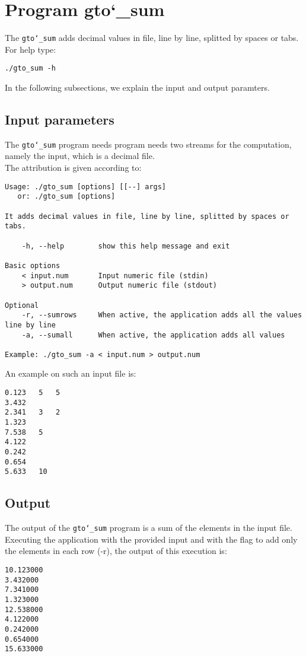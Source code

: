 \section{Program gto\char`_sum}
The \texttt{gto\char`_sum} adds decimal values in file, line by line, splitted by spaces or tabs.\\
For help type:
\begin{lstlisting}
./gto_sum -h
\end{lstlisting}
In the following subsections, we explain the input and output paramters.

\subsection*{Input parameters}

The \texttt{gto\char`_sum} program needs program needs two streams for the computation, namely the input, which is a decimal file.\\
The attribution is given according to:
\begin{lstlisting}
Usage: ./gto_sum [options] [[--] args]
   or: ./gto_sum [options]

It adds decimal values in file, line by line, splitted by spaces or tabs.

    -h, --help        show this help message and exit

Basic options
    < input.num       Input numeric file (stdin)
    > output.num      Output numeric file (stdout)

Optional
    -r, --sumrows     When active, the application adds all the values line by line
    -a, --sumall      When active, the application adds all values

Example: ./gto_sum -a < input.num > output.num
\end{lstlisting}
An example on such an input file is:
\begin{lstlisting}
0.123	5	5
3.432
2.341   3   2
1.323
7.538	5
4.122
0.242 
0.654
5.633	10
\end{lstlisting}

\subsection*{Output}
The output of the \texttt{gto\char`_sum} program is a sum of the elements in the input file.\\
Executing the application with the provided input and with the flag to add only the elements in each row (-r), the output of this execution is:
\begin{lstlisting}
10.123000
3.432000
7.341000
1.323000
12.538000
4.122000
0.242000
0.654000
15.633000
\end{lstlisting}